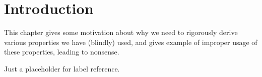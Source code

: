\chapter{Introduction}\label{ch 1}
\begin{note}
This chapter gives some motivation about why we need to rigorously derive various properties we have (blindly) used, and gives example of improper usage of these properties, leading to nonsense.
\end{note}

\setcounter{section}{2}
\setcounter{theorem}{2}
\begin{example} \label{example 1.2.3}
Just a placeholder for label reference.
\end{example}